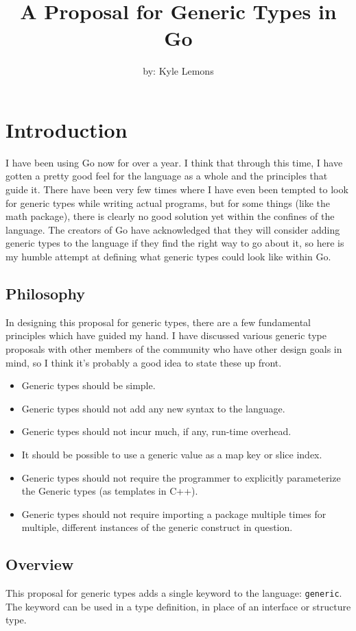 \documentclass[10pt]{article}
\author{by: Kyle Lemons}
\title{A Proposal for Generic Types in Go}
\newcommand{\code}[1]{\texttt{#1}}
\begin{document}
\maketitle
\tableofcontents
\lstlistoflistings
\newpage
\section{Introduction}
I have been using Go now for over a year.  I think that through this time, I have gotten a pretty good feel for the language as a whole and the principles that guide it.  There have been very few times where I have even been tempted to look for generic types while writing actual programs, but for some things (like the math package), there is clearly no good solution yet within the confines of the language.  The creators of Go have acknowledged that they will consider adding generic types to the language if they find the right way to go about it, so here is my humble attempt at defining what generic types could look like within Go.

\subsection{Philosophy}
In designing this proposal for generic types, there are a few fundamental principles which have guided my hand.  I have discussed various generic type proposals with other members of the community who have other design goals in mind, so I think it's probably a good idea to state these up front.
\begin{itemize}
\item Generic types should be simple.
\item Generic types should not add any new syntax to the language.
\item Generic types should not incur much, if any, run-time overhead.
\item It should be possible to use a generic value as a map key or slice index.
\item Generic types should not require the programmer to explicitly parameterize the Generic types (as templates in C++).
\item Generic types should not require importing a package multiple times for multiple, different instances of the generic construct in question.
\end{itemize}

\subsection{Overview}
This proposal for generic types adds a single keyword to the language: \code{generic}.  The keyword can be used in a type definition, in place of an interface or structure type.
\end{document}

